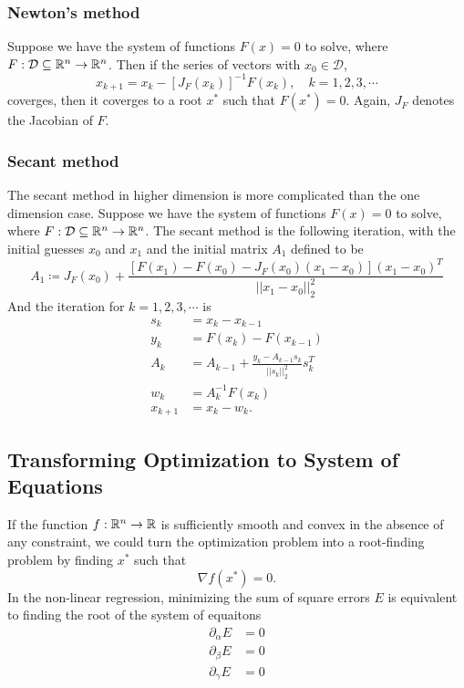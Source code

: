 \begin{table}[H]
\subsubsection{Newton's method}
Suppose we have the system of functions \(F(x)=0\) to solve, where \(F:\mathcal{D}\subseteq\mathbb{R}^{n}\to\mathbb{R}^n\).
Then if the series of vectors with \(x_0\in\mathcal{D}\),
\[ x_{k+1}=x_k-[J_F(x_k)]^{-1}F(x_k), \quad k=1,2,3,\cdots \]
coverges, then it coverges to a root \(x^*\) such that \(F(x^*)=0\).
Again, \(J_F\) denotes the Jacobian of \(F\).



\subsubsection{Secant method}
The secant method in higher dimension is more complicated than the one dimension case.
Suppose we have the system of functions \(F(x)=0\) to solve, where \(F:\mathcal{D}\subseteq\mathbb{R}^{n}\to\mathbb{R}^n\).
The secant method is the following iteration, with the initial guesses \(x_0\) and \(x_1\) and the initial matrix \(A_1\) defined to be
\[ A_1\coloneqq J_F(x_0)+\frac{\left[F(x_1)-F(x_0)-J_F(x_0)(x_1-x_0)\right](x_1-x_0)^T}{||x_1-x_0||_2^2} \]
And the iteration for \(k=1,2,3,\cdots\) is
\begin{align*}
	s_k&=x_{k}-x_{k-1}\\
	y_k&=F(x_k)-F(x_{k-1})\\
	A_k&=A_{k-1}+\frac{y_k-A_{k-1}s_k}{||s_k||_2^2}s_k^T\\
	w_k&=A_k^{-1}F(x_k)\\
	x_{k+1}&=x_k-w_k.
\end{align*}




\subsection{Transforming Optimization to System of Equations}
If the function \(f:\mathbb{R}^n\to\mathbb{R}\) is sufficiently smooth and convex in the absence of any constraint, we could turn the optimization problem into a root-finding problem by finding \(x^*\) such that
\[ \nabla f(x^*)=0. \]
In the non-linear regression, minimizing the sum of square errors \(E\) is equivalent to finding the root of the system of equaitons
\begin{equation}\label{eqn3}
\begin{aligned}
\partial_{\alpha}E&=0\\
\partial_{\beta}E&=0\\
\partial_{\gamma}E&=0
\end{aligned}
\end{equation}



\end{table}
